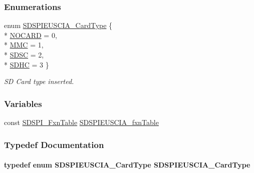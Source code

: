 \subsubsection*{Enumerations}
\begin{DoxyCompactItemize}
\item 
enum \hyperlink{_s_d_s_p_i_e_u_s_c_i_a_8h_aaf384a8a07d5fb92b9ba72250174d577}{S\+D\+S\+P\+I\+E\+U\+S\+C\+I\+A\+\_\+\+Card\+Type} \{ \\*
\hyperlink{_s_d_s_p_i_e_u_s_c_i_a_8h_aaf384a8a07d5fb92b9ba72250174d577a422cdc20ba86c8cdcf1f0fd2318a1cfc}{N\+O\+C\+A\+R\+D} = 0, 
\\*
\hyperlink{_s_d_s_p_i_e_u_s_c_i_a_8h_aaf384a8a07d5fb92b9ba72250174d577aa7d8fca3406f36682514f0384d910fac}{M\+M\+C} = 1, 
\\*
\hyperlink{_s_d_s_p_i_e_u_s_c_i_a_8h_aaf384a8a07d5fb92b9ba72250174d577a87550a2102744c14e5e2e0ed39cc04b2}{S\+D\+S\+C} = 2, 
\\*
\hyperlink{_s_d_s_p_i_e_u_s_c_i_a_8h_aaf384a8a07d5fb92b9ba72250174d577ab27db2a19a825c3e6f1513cdab7c81ea}{S\+D\+H\+C} = 3
 \}
\begin{DoxyCompactList}\small\item\em S\+D Card type inserted. \end{DoxyCompactList}\end{DoxyCompactItemize}
\subsubsection*{Variables}
\begin{DoxyCompactItemize}
\item 
const \hyperlink{struct_s_d_s_p_i___fxn_table}{S\+D\+S\+P\+I\+\_\+\+Fxn\+Table} \hyperlink{_s_d_s_p_i_e_u_s_c_i_a_8h_a26e25236d260c935622e578d07b4ad9c}{S\+D\+S\+P\+I\+E\+U\+S\+C\+I\+A\+\_\+fxn\+Table}
\end{DoxyCompactItemize}


\subsubsection{Typedef Documentation}
\paragraph[{S\+D\+S\+P\+I\+E\+U\+S\+C\+I\+A\+\_\+\+Card\+Type}]{\setlength{\rightskip}{0pt plus 5cm}typedef enum {\bf S\+D\+S\+P\+I\+E\+U\+S\+C\+I\+A\+\_\+\+Card\+Type}  {\bf S\+D\+S\+P\+I\+E\+U\+S\+C\+I\+A\+\_\+\+Card\+Type}}\label{_s_d_s_p_i_e_u_s_c_i_a_8h_a362d5b7bf44624901c58b48939699cd4}


